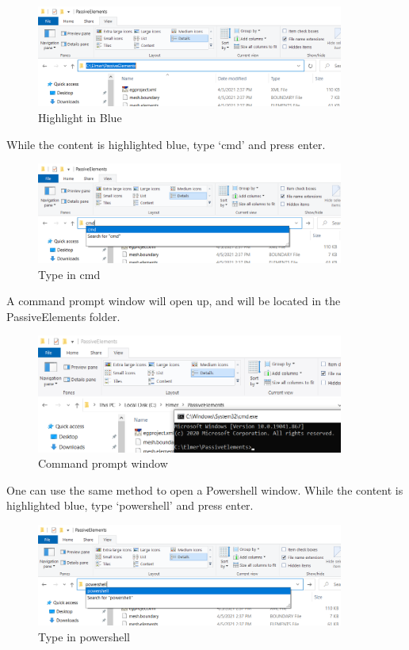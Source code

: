 \begin{figure}[H]
\centering
\includegraphics[width=0.9\textwidth]{cmd-2}
\caption{Highlight in Blue}\label{fg:cmd-2}
\end{figure}

While the content is highlighted blue, type `cmd' and press enter.

\begin{figure}[H]
\centering
\includegraphics[width=0.9\textwidth]{cmd-3}
\caption{Type in cmd}\label{fg:cmd-3}
\end{figure}

A command prompt window will open up, and will be located in the PassiveElements folder.\\

\begin{figure}[H]
\centering
\includegraphics[width=0.9\textwidth]{cmd-4}
\caption{Command prompt window}\label{fg:cmd-4}
\end{figure}

\newpage

One can use the same method to open a Powershell window.  While the content is highlighted blue, type `powershell' and press enter.

\begin{figure}[H]
\centering
\includegraphics[width=0.9\textwidth]{cmd-5}
\caption{Type in powershell}\label{fg:cmd-5}
\end{figure}

